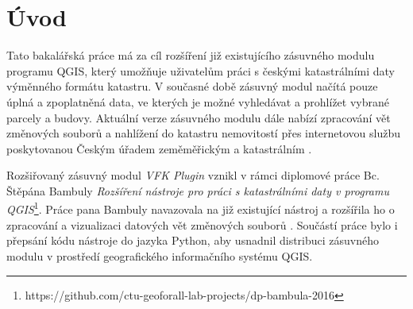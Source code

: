 \chapter{Úvod}
\label{1-uvod}
Tato bakalářská práce má za cíl rozšíření již existujícího zásuvného modulu programu QGIS, který umožňuje uživatelům práci s českými katastrálními daty výměnného formátu katastru. V současné době zásuvný modul načítá pouze úplná a zpoplatněná data, ve kterých je možné vyhledávat a prohlížet vybrané parcely a budovy. Aktuální verze zásuvného modulu dále nabízí zpracování vět změnových souborů a nahlížení do katastru nemovitostí přes internetovou službu poskytovanou Českým úřadem zeměměřickým a katastrálním .




Rozšiřovaný zásuvný modul \textit{VFK Plugin} vznikl v rámci diplomové práce Bc. Štěpána Bambuly \textit{Rozšíření nástroje pro práci s katastrálními daty v programu QGIS}\footnote{https://github.com/ctu-geoforall-lab-projects/dp-bambula-2016}. Práce pana Bambuly navazovala na již existující nástroj a rozšířila ho o zpracování a vizualizaci datových vět změnových souborů . Součástí práce bylo i přepsání kódu nástroje do jazyka Python, aby usnadnil distribuci zásuvného modulu v prostředí geografického informačního systému QGIS.

